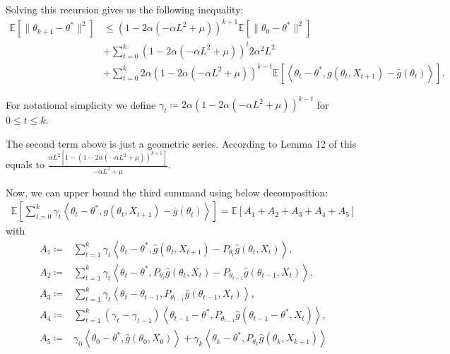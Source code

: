 \documentclass[a4paper]{article}
\newcommand{\norm}[1]{\|#1 \|}
\newcommand{\Exs}{\mathbb{E}}
\newcommand{\thetastar}{\theta^*}
\newcommand{\stepsize}{\alpha}
\begin{document}
	Solving this recursion gives us the following inequality:
	\begin{align*}
		\Exs\left[\norm{\theta_{k + 1} - \thetastar}^{2}\right] & \le \left(1 - 2\stepsize\left(-\stepsize L^{2} + \mu\right)\right)^{k + 1}\Exs\left[\norm{\theta_{0} - \thetastar}^{2}\right] \\
		& + \sum_{t = 0}^{k}\left(1 - 2\stepsize\left(-\stepsize L^{2} + \mu\right)\right)^{t}2\stepsize^{2}L^{2} \\
		& + \sum_{t = 0}^{k}2\stepsize\left(1 - 2\stepsize\left(-\stepsize L^{2} + \mu\right)\right)^{k - t}\Exs\left[\left\langle \theta_{t} - \thetastar, g\left(\theta_{t}, X_{t + 1}\right) - \bar{g}\left(\theta_{t}\right) \right\rangle\right].
	\end{align*}
	
	For notational simplicity we define $\gamma_{t} \coloneq 2\stepsize\left(1 - 2\stepsize\left(-\stepsize L^{2} + \mu\right)\right)^{k - t}$ for $0 \le t \le k$.
	
	The second term above is just a geometric series. According to Lemma 12 of \cite{kaledin2020finite} this equals to $\frac{\stepsize L^{2}\left[1 - \left(1 - 2\stepsize\left(-\stepsize L^{2} + \mu\right)\right)^{k + 1}\right]}{-\stepsize L^{2} + \mu}$.
	
	Now, we can upper bound the third summand using below decomposition:
	\begin{align*}
		\Exs\left[ \sum_{t = 0}^{k} \gamma_{t}\left\langle \theta_{t} - \thetastar, g(\theta_{t}, X_{t + 1}) - \bar{g}(\theta_{t}) \right\rangle \right] = \Exs\left[ A_{1} + A_{2} + A_{3} + A_{4} + A_{5}\right]
	\end{align*}
	with
	\begin{align*}
		A_{1} \coloneq & \sum_{t = 1}^{k}\gamma_{t}\left\langle \theta_{t} - \thetastar, \hat{g}\left(\theta_{t}, X_{t + 1}\right) - P_{\theta_{t}}\hat{g}\left(\theta_{t}, X_{t}\right) \right\rangle,\\
		A_{2} \coloneq & \sum_{t = 1}^{k}\gamma_{t}\left\langle \theta_{t} - \thetastar, P_{\theta_{t}}\hat{g}\left(\theta_{t}, X_{t}\right) - P_{\theta_{t - 1}}\hat{g}\left( \theta_{t - 1}, X_{t} \right) \right\rangle,\\
		A_{3} \coloneq & \sum_{t = 1}^{k}\gamma_{t}\left\langle \theta_{t} - \theta_{t - 1}, P_{\theta_{t - 1}}\hat{g}\left( \theta_{t - 1}, X_{t}\right) \right\rangle,\\
		A_{4} \coloneq & \sum_{t = 1}^{k}\left(\gamma_{t} - \gamma_{t - 1}\right)\left\langle \theta_{t - 1} - \thetastar, P_{\theta_{t - 1}}\hat{g}\left( \theta_{t - 1} - \thetastar, X_{t}\right) \right\rangle,\\
		A_{5} \coloneq & \gamma_{0}\left\langle \theta_{0} - \thetastar, \hat{g}\left(\theta_{0}, X_{0}\right) \right\rangle + \gamma_{k}\left\langle \theta_{k} - \thetastar, P_{\theta_{k}}\hat{g}\left(\theta_{k}, X_{k + 1}\right)\right\rangle
	\end{align*}
	
\end{document}
